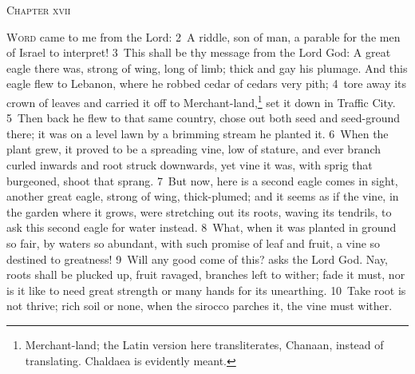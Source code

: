 \documentclass[10pt]{book} %
\begin{document}
\begin{large}\begin{center}\textsc{Chapter xvii}\end{center}\end{large}
\lettrine[lines=2]{W}{ord} came to me from the Lord: \textcolor{benred8}{2}~A riddle, son of man, a parable for the men of Israel to interpret! \textcolor{benred8}{3}~This shall be thy message from the Lord God: A great eagle there was, strong of wing, long of limb; thick and gay his plumage. And this eagle flew to Lebanon, where he robbed cedar of cedar\textquotesingle s very pith; \textcolor{benred8}{4}~tore away its crown of leaves and carried it off to Merchant-land,\footnote[1]{\textasciigrave Merchant-land\textquotesingle ; the Latin version here transliterates, \textasciigrave Chanaan\textquotesingle , instead of translating. Chaldaea is evidently meant.} set it down in Traffic City. \textcolor{benred8}{5}~Then back he flew to that same country, chose out both seed and seed-ground there; it was on a level lawn by a brimming stream he planted it. \textcolor{benred8}{6}~When the plant grew, it proved to be a spreading vine, low of stature, and ever branch curled inwards and root struck downwards, yet vine it was, with sprig that burgeoned, shoot that sprang. \textcolor{benred8}{7}~But now, here is a second eagle comes in sight, another great eagle, strong of wing, thick-plumed; and it seems as if the vine, in the garden where it grows, were stretching out its roots, waving its tendrils, to ask this second eagle for water instead. \textcolor{benred8}{8}~What, when it was planted in ground so fair, by waters so abundant, with such promise of leaf and fruit, a vine so destined to greatness! \textcolor{benred8}{9}~Will any good come of this? asks the Lord God. Nay, roots shall be plucked up, fruit ravaged, branches left to wither; fade it must, nor is it like to need great strength or many hands for its unearthing. \textcolor{benred8}{10}~Take root is not thrive; rich soil or none, when the sirocco parches it, the vine must wither.
\end{document}
